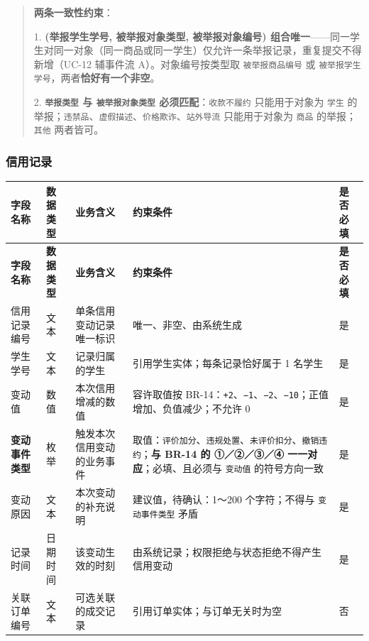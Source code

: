 \documentclass[12pt,a4paper]{ctexart}
\begin{document}
\begin{quote}\small
\textbf{两条一致性约束}：

1. \textbf{(举报学生学号, 被举报对象类型, 被举报对象编号) 组合唯一}——同一学生对同一对象（同一商品或同一学生）仅允许一条举报记录，重复提交不得新增（UC-12 辅事件流 A）。对象编号按类型取 \texttt{被举报商品编号} 或 \texttt{被举报学生学号}，两者\textbf{恰好有一个非空}。

2. \textbf{\texttt{举报类型} 与 \texttt{被举报对象类型} 必须匹配}：\texttt{收款不履约} 只能用于对象为 \texttt{学生} 的举报；\texttt{违禁品}、\texttt{虚假描述}、\texttt{价格欺诈}、\texttt{站外导流} 只能用于对象为 \texttt{商品} 的举报；\texttt{其他} 两者皆可。

\end{quote}

\subsubsection*{信用记录}

{\footnotesize
\begin{longtable}{|p{1.65cm}|p{1.50cm}|p{2.87cm}|p{8.48cm}|p{1.50cm}|}
\hline
\textbf{字段名称} & \textbf{数据类型} & \textbf{业务含义} & \textbf{约束条件} & \textbf{是否必填} \\
\hline
\endfirsthead
\hline
\textbf{字段名称} & \textbf{数据类型} & \textbf{业务含义} & \textbf{约束条件} & \textbf{是否必填} \\
\hline
\endhead
\hline
\endfoot
信用记录编号 & 文本 & 单条信用变动记录唯一标识 & 唯一、非空、由系统生成 & 是 \\
\hline
学生学号 & 文本 & 记录归属的学生 & 引用学生实体；每条记录恰好属于 1 名学生 & 是 \\
\hline
变动值 & 数值 & 本次信用增减的数值 & 容许取值按 BR-14：\texttt{+2}、\texttt{−1}、\texttt{−2}、\texttt{−10}；正值增加、负值减少；不允许 0 & 是 \\
\hline
\textbf{变动事件类型} & 枚举 & 触发本次信用变动的业务事件 & 取值：\texttt{评价加分}、\texttt{违规处置}、\texttt{未评价扣分}、\texttt{撤销违约}；\textbf{与 BR-14 的 ①／②／③／④ 一一对应}；必填、且必须与 \texttt{变动值} 的符号方向一致 & 是 \\
\hline
变动原因 & 文本 & 本次变动的补充说明 & 建议值，待确认：1～200 个字符；不得与 \texttt{变动事件类型} 矛盾 & 是 \\
\hline
记录时间 & 日期时间 & 该变动生效的时刻 & 由系统记录；权限拒绝与状态拒绝不得产生信用变动 & 是 \\
\hline
关联订单编号 & 文本 & 可选关联的成交记录 & 引用订单实体；与订单无关时为空 & 否 \\
\hline
\end{longtable}
}
\end{document}
